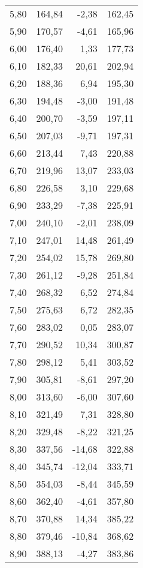 \documentclass{article}
\begin{document}
\begin{center}
\begin{longtable}{r|r|r|r}
        5,80 & 164,84 & -2,38 & 162,45 \\
        5,90 & 170,57 & -4,61 & 165,96 \\
        6,00 & 176,40 & 1,33 & 177,73 \\
        6,10 & 182,33 & 20,61 & 202,94 \\
        6,20 & 188,36 & 6,94 & 195,30 \\
        6,30 & 194,48 & -3,00 & 191,48 \\
        6,40 & 200,70 & -3,59 & 197,11 \\
        6,50 & 207,03 & -9,71 & 197,31 \\
        6,60 & 213,44 & 7,43 & 220,88 \\
        6,70 & 219,96 & 13,07 & 233,03 \\
        6,80 & 226,58 & 3,10 & 229,68 \\
        6,90 & 233,29 & -7,38 & 225,91 \\
        7,00 & 240,10 & -2,01 & 238,09 \\
        7,10 & 247,01 & 14,48 & 261,49 \\
        7,20 & 254,02 & 15,78 & 269,80 \\
        7,30 & 261,12 & -9,28 & 251,84 \\
        7,40 & 268,32 & 6,52 & 274,84 \\
        7,50 & 275,63 & 6,72 & 282,35 \\
        7,60 & 283,02 & 0,05 & 283,07 \\
        7,70 & 290,52 & 10,34 & 300,87 \\
        7,80 & 298,12 & 5,41 & 303,52 \\
        7,90 & 305,81 & -8,61 & 297,20 \\
        8,00 & 313,60 & -6,00 & 307,60 \\
        8,10 & 321,49 & 7,31 & 328,80 \\
        8,20 & 329,48 & -8,22 & 321,25 \\
        8,30 & 337,56 & -14,68 & 322,88 \\
        8,40 & 345,74 & -12,04 & 333,71 \\
        8,50 & 354,03 & -8,44 & 345,59 \\
        8,60 & 362,40 & -4,61 & 357,80 \\
        8,70 & 370,88 & 14,34 & 385,22 \\
        8,80 & 379,46 & -10,84 & 368,62 \\
        8,90 & 388,13 & -4,27 & 383,86 \\

\end{longtable}
\end{center}
\end{document}
